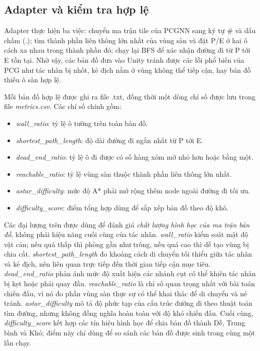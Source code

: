 \subsection{Adapter và kiểm tra hợp lệ}

Adapter thực hiện ba việc: chuyển ma trận tile của PCGNN sang ký tự \# và dấu chấm (.); tìm thành phần liên thông lớn nhất của vùng sàn và đặt P/E ở hai ô cách xa nhau trong thành phần đó; chạy lại BFS để xác nhận đường đi từ P tới E tồn tại. Nhờ vậy, các bản đồ đưa vào Unity tránh được các lỗi phổ biến của PCG như tác nhân bị nhốt, kẻ địch nằm ở vùng không thể tiếp cận, hay bản đồ thiếu ô sàn hợp lệ.

Mỗi bản đồ hợp lệ được ghi ra file .txt, đồng thời một dòng chỉ số được lưu trong file \emph{metrics.csv}. Các chỉ số chính gồm:

\begin{itemize}
    \item \emph{wall\_ratio}: tỷ lệ ô tường trên toàn bản đồ.
    \item \emph{shortest\_path\_length}: độ dài đường đi ngắn nhất từ P tới E.
    \item \emph{dead\_end\_ratio}: tỷ lệ ô đi được có số hàng xóm mở nhỏ hơn hoặc bằng một.
    \item \emph{reachable\_ratio}: tỷ lệ vùng sàn thuộc thành phần liên thông lớn nhất.
    \item \emph{astar\_difficulty}: mức độ A* phải mở rộng thêm node ngoài đường đi tối ưu.
    \item \emph{difficulty\_score}: điểm tổng hợp dùng để sắp xếp bản đồ theo độ khó.
\end{itemize}

Các đại lượng trên được dùng để đánh giá \emph{chất lượng hình học của ma trận bản đồ}, không phải hiệu năng cuối cùng của tác nhân. \emph{wall\_ratio} kiểm soát mật độ vật cản; nếu quá thấp thì phòng gần như trống, nếu quá cao thì dễ tạo vùng bị chia cắt. \emph{shortest\_path\_length} đo khoảng cách di chuyển tối thiểu giữa tác nhân và kẻ địch, nên liên quan trực tiếp đến thời gian tiếp cận mục tiêu. \emph{dead\_end\_ratio} phản ánh mức độ xuất hiện các nhánh cụt có thể khiến tác nhân bị kẹt hoặc phải quay đầu. \emph{reachable\_ratio} là chỉ số quan trọng nhất với bài toán chiến đấu, vì nó đo phần vùng sàn thực sự có thể khai thác để di chuyển và né tránh. \emph{astar\_difficulty} mô tả độ phức tạp của cấu trúc đường đi theo thuật toán tìm đường, nhưng không đồng nghĩa hoàn toàn với độ khó chiến đấu. Cuối cùng, \emph{difficulty\_score} kết hợp các tín hiệu hình học để chia bản đồ thành Dễ, Trung bình và Khó; điểm này chỉ dùng để so sánh các bản đồ được sinh trong cùng một lần chạy.

